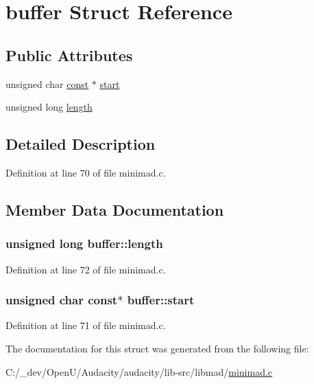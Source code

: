 \hypertarget{structbuffer}{}\section{buffer Struct Reference}
\label{structbuffer}
\subsection*{Public Attributes}
\begin{DoxyCompactItemize}
\item 
unsigned char \hyperlink{getopt1_8c_a2c212835823e3c54a8ab6d95c652660e}{const} $\ast$ \hyperlink{structbuffer_afac3164fe025b82288dfbb36dec15374}{start}
\item 
unsigned long \hyperlink{structbuffer_ac7ba3f94074d5396875f714916bf1cd1}{length}
\end{DoxyCompactItemize}


\subsection{Detailed Description}


Definition at line 70 of file minimad.\+c.



\subsection{Member Data Documentation}
\subsubsection[{\texorpdfstring{length}{length}}]{\setlength{\rightskip}{0pt plus 5cm}unsigned long buffer\+::length}\hypertarget{structbuffer_ac7ba3f94074d5396875f714916bf1cd1}{}\label{structbuffer_ac7ba3f94074d5396875f714916bf1cd1}


Definition at line 72 of file minimad.\+c.

\subsubsection[{\texorpdfstring{start}{start}}]{\setlength{\rightskip}{0pt plus 5cm}unsigned char {\bf const}$\ast$ buffer\+::start}\hypertarget{structbuffer_afac3164fe025b82288dfbb36dec15374}{}\label{structbuffer_afac3164fe025b82288dfbb36dec15374}


Definition at line 71 of file minimad.\+c.



The documentation for this struct was generated from the following file\+:\begin{DoxyCompactItemize}
\item 
C\+:/\+\_\+dev/\+Open\+U/\+Audacity/audacity/lib-\/src/libmad/\hyperlink{minimad_8c}{minimad.\+c}\end{DoxyCompactItemize}
